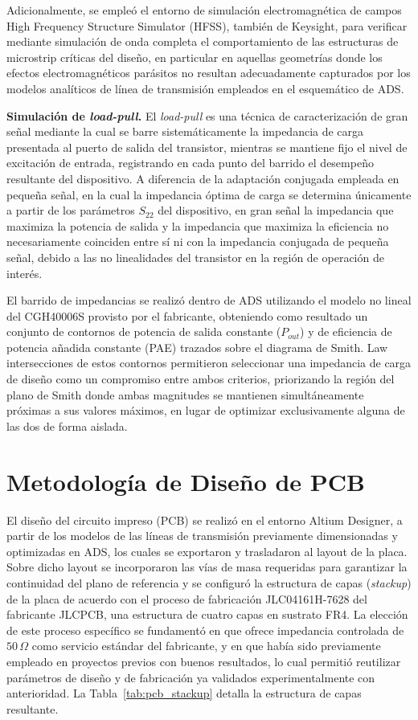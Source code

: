 Adicionalmente, se empleó el entorno de simulación electromagnética de campos High Frequency Structure Simulator (HFSS), también de Keysight, para verificar mediante simulación de onda completa el comportamiento de las estructuras de microstrip críticas del diseño, en particular en aquellas geometrías donde los efectos electromagnéticos parásitos no resultan adecuadamente capturados por los modelos analíticos de línea de transmisión empleados en el esquemático de ADS.

\textbf{Simulación de \textit{load-pull}.} El \textit{load-pull} es una técnica de caracterización de gran señal mediante la cual se barre sistemáticamente la impedancia de carga presentada al puerto de salida del transistor, mientras se mantiene fijo el nivel de excitación de entrada, registrando en cada punto del barrido el desempeño resultante del dispositivo. A diferencia de la adaptación conjugada empleada en pequeña señal, en la cual la impedancia óptima de carga se determina únicamente a partir de los parámetros $S_{22}$ del dispositivo, en gran señal la impedancia que maximiza la potencia de salida y la impedancia que maximiza la eficiencia no necesariamente coinciden entre sí ni con la impedancia conjugada de pequeña señal, debido a las no linealidades del transistor en la región de operación de interés.

El barrido de impedancias se realizó dentro de ADS utilizando el modelo no lineal del CGH40006S provisto por el fabricante, obteniendo como resultado un conjunto de contornos de potencia de salida constante ($P_{out}$) y de eficiencia de potencia añadida constante (PAE) trazados sobre el diagrama de Smith. Law intersecciones de estos contornos permitieron seleccionar una impedancia de carga de diseño como un compromiso entre ambos criterios, priorizando la región del plano de Smith donde ambas magnitudes se mantienen simultáneamente próximas a sus valores máximos, en lugar de optimizar exclusivamente alguna de las dos de forma aislada.

\section{Metodología de Diseño de PCB}
El diseño del circuito impreso (PCB) se realizó en el entorno Altium Designer, a partir de los modelos de las líneas de transmisión previamente dimensionadas y optimizadas en ADS, los cuales se exportaron y trasladaron al layout de la placa. Sobre dicho layout se incorporaron las vías de masa requeridas para garantizar la continuidad del plano de referencia y se configuró la estructura de capas (\textit{stackup}) de la placa de acuerdo con el proceso de fabricación JLC04161H-7628 del fabricante JLCPCB, una estructura de cuatro capas en sustrato FR4. La elección de este proceso específico se fundamentó en que ofrece impedancia controlada de $50\,\Omega$ como servicio estándar del fabricante, y en que había sido previamente empleado en proyectos previos con buenos resultados, lo cual permitió reutilizar parámetros de diseño y de fabricación ya validados experimentalmente con anterioridad. La Tabla~\ref{tab:pcb_stackup} detalla la estructura de capas resultante.

